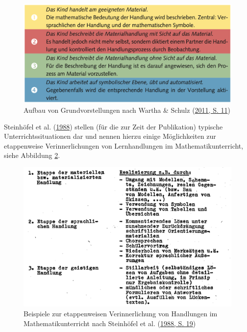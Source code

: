 \documentclass[
]{scrbook}
\theoremstyle{definition}
\theoremstyle{definition}
\theoremstyle{definition}
\theoremstyle{definition}
\theoremstyle{remark}
\begin{document}
\begin{figure}

{\centering \includegraphics[width=0.9\linewidth]{pictures/6-GVverinnerlichen} 

}

\caption{Aufbau von Grundvorstellungen nach Wartha \& Schulz (\protect\hyperlink{ref-Wartha2011}{2011, S. 11})}\label{fig:GVVerinnerlichen}
\end{figure}

Steinhöfel et al. (\protect\hyperlink{ref-Steinhofel1988}{1988}) stellen (für die zur Zeit der Publikation) typische Unterrichtssituationen dar und nennen hierzu einige Möglichkeiten zur etappenweise Verinnerlichungen von Lernhandlungen im Mathematikunterricht, siehe Abbildung \ref{fig:Etappen}.



\begin{figure}

{\centering \includegraphics[width=0.9\linewidth]{pictures/6-Etappen} 

}

\caption{Beispiele zur etappenweisen Verinnerlichung von Handlungen im Mathematikunterricht nach Steinhöfel et al. (\protect\hyperlink{ref-Steinhofel1988}{1988, S. 19})}\label{fig:Etappen}
\end{figure}
\end{document}
